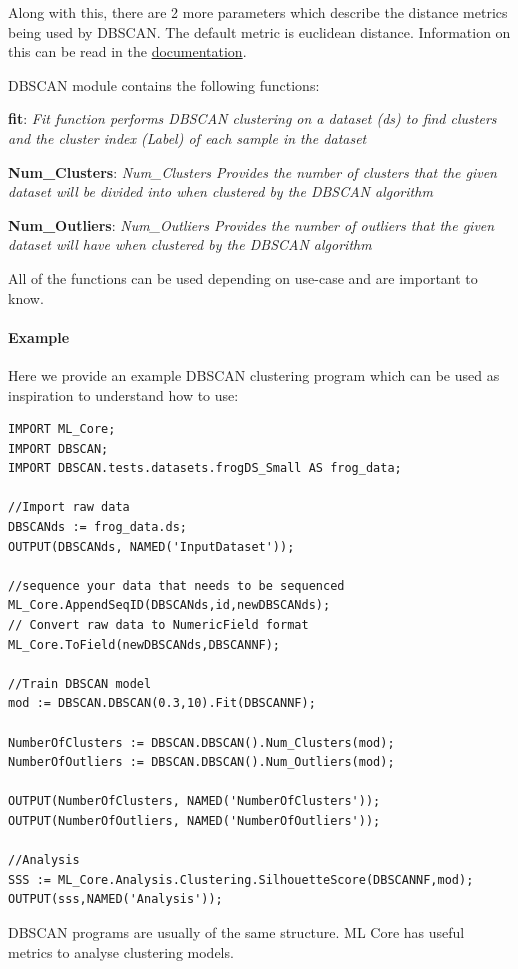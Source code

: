 Along with this, there are 2 more parameters which describe the distance metrics being used by DBSCAN. The default metric is euclidean distance. Information on this can be read in the \href{https://cdn.hpccsystems.com/pdf/ml/dbscan.pdf}{documentation}.

DBSCAN module contains the following functions:

\textbf{fit}: \textit{Fit function performs DBSCAN clustering on a dataset (ds) to find clusters and the cluster index (Label) of each sample in the dataset}

\textbf{Num\_Clusters}: \textit{Num\_Clusters Provides the number of clusters that the given dataset will be divided into when clustered by the DBSCAN algorithm}

\textbf{Num\_Outliers}: \textit{Num\_Outliers Provides the number of outliers that the given dataset will have when clustered by the DBSCAN algorithm}

All of the functions can be used depending on use-case and are important to know.

\paragraph{Example}

Here we provide an example DBSCAN clustering program which can be used as inspiration to understand how to use:

\begin{lstlisting}
IMPORT ML_Core;
IMPORT DBSCAN;
IMPORT DBSCAN.tests.datasets.frogDS_Small AS frog_data;

//Import raw data
DBSCANds := frog_data.ds;
OUTPUT(DBSCANds, NAMED('InputDataset'));

//sequence your data that needs to be sequenced
ML_Core.AppendSeqID(DBSCANds,id,newDBSCANds);
// Convert raw data to NumericField format
ML_Core.ToField(newDBSCANds,DBSCANNF);

//Train DBSCAN model 
mod := DBSCAN.DBSCAN(0.3,10).Fit(DBSCANNF);

NumberOfClusters := DBSCAN.DBSCAN().Num_Clusters(mod);
NumberOfOutliers := DBSCAN.DBSCAN().Num_Outliers(mod);

OUTPUT(NumberOfClusters, NAMED('NumberOfClusters'));
OUTPUT(NumberOfOutliers, NAMED('NumberOfOutliers'));

//Analysis
SSS := ML_Core.Analysis.Clustering.SilhouetteScore(DBSCANNF,mod);
OUTPUT(sss,NAMED('Analysis'));
\end{lstlisting}

DBSCAN programs are usually of the same structure. ML Core has useful metrics to analyse clustering models.
